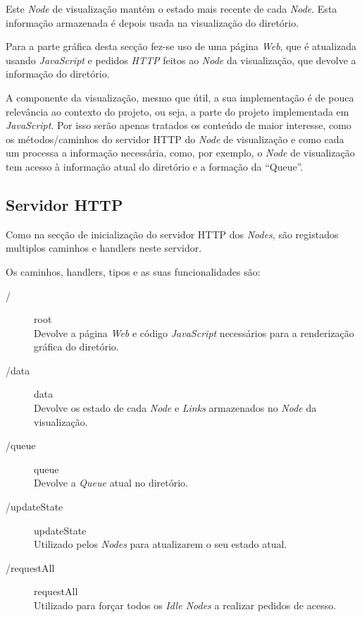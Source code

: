 Este \emph{Node} de visualização mantém o estado mais recente de cada \emph{Node}. 
Esta informação armazenada é depois usada na visualização do diretório.

Para a parte gráfica desta secção fez-se uso de uma página \emph{Web}, que é atualizada usando \emph{JavaScript} e 
pedidos \emph{HTTP} feitos ao \emph{Node} da visualização, que devolve a informação do diretório.

A componente da visualização, mesmo que útil, a sua implementação é de pouca relevância ao contexto do projeto, ou seja, a parte do projeto implementada em \emph{JavaScript}.
Por isso serão apenas tratados os conteúdo de maior interesse, como os métodos/caminhos do servidor \acs{HTTP} do \emph{Node} de visualização e como cada um processa a informação necessária, como, por exemplo, o \emph{Node} de visualização tem acesso à informação atual do diretório e a formação da ``Queue''.



\subsection*{Servidor \acs{HTTP}}
Como na secção de inicialização do servidor \acs{HTTP} dos \emph{Nodes}, são registados 
multiplos caminhos e handlers neste servidor.

Os caminhos, handlers, tipos e as suas funcionalidades são:
\begin{description}
\item [/] root  \\ Devolve a página \emph{Web} e código \emph{JavaScript} necessários para a renderização gráfica do diretório.
\item [/data] data \\ Devolve os estado de cada \emph{Node} e \emph{Links} armazenados no \emph{Node} da visualização.
\item [/queue] queue \\ Devolve a \emph{Queue} atual no diretório.
\item [/updateState] updateState \\ Utilizado pelos \emph{Nodes} para atualizarem o seu estado atual.
\item [/requestAll] requestAll \\Utilizado para forçar todos os \emph{Idle Nodes} a realizar pedidos de acesso.
\end{description}

